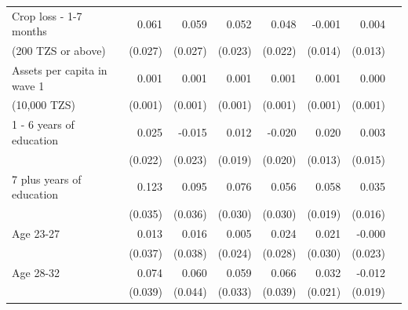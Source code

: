 \documentclass[letterpaper,12pt]{article}
\newcommand{\hs}{\hspace{15pt}}
\begin{document}
\begin{table}[htbp]
\begin{center}
\begin{footnotesize}
\begin{threeparttable}
\begin{tabular}{@{} l D{.}{.}{2.6} D{.}{.}{2.6}  D{.}{.}{2.6} D{.}{.}{2.6} D{.}{.}{2.6} D{.}{.}{2.6} D{.}{.}{2.6}  @{}}
\midrule
Crop loss - 1-7 months                                 &       0.061\sym{**} &       0.059\sym{**} &       0.052\sym{**} &       0.048\sym{**} &      -0.001         &       0.004         \\
\hs (200 TZS or above)                                 &     (0.027)         &     (0.027)         &     (0.023)         &     (0.022)         &     (0.014)         &     (0.013)         \\
Assets per capita in wave 1                            &       0.001         &       0.001         &       0.001         &       0.001         &       0.001         &       0.000         \\
\hs (10,000 TZS)                                       &     (0.001)         &     (0.001)         &     (0.001)         &     (0.001)         &     (0.001)         &     (0.001)         \\
1 - 6 years of education                               &       0.025         &      -0.015         &       0.012         &      -0.020         &       0.020         &       0.003         \\
                                                       &     (0.022)         &     (0.023)         &     (0.019)         &     (0.020)         &     (0.013)         &     (0.015)         \\
7 plus years of education                              &       0.123\sym{***}&       0.095\sym{***}&       0.076\sym{**} &       0.056\sym{*}  &       0.058\sym{***}&       0.035\sym{**} \\
                                                       &     (0.035)         &     (0.036)         &     (0.030)         &     (0.030)         &     (0.019)         &     (0.016)         \\
Age 23-27                                              &       0.013         &       0.016         &       0.005         &       0.024         &       0.021         &      -0.000         \\
                                                       &     (0.037)         &     (0.038)         &     (0.024)         &     (0.028)         &     (0.030)         &     (0.023)         \\
Age 28-32                                              &       0.074\sym{*}  &       0.060         &       0.059\sym{*}  &       0.066\sym{*}  &       0.032         &      -0.012         \\
                                                       &     (0.039)         &     (0.044)         &     (0.033)         &     (0.039)         &     (0.021)         &     (0.019)         \\

\end{tabular}
\end{threeparttable}
\end{footnotesize}
\end{center}
\end{table}
\end{document}
